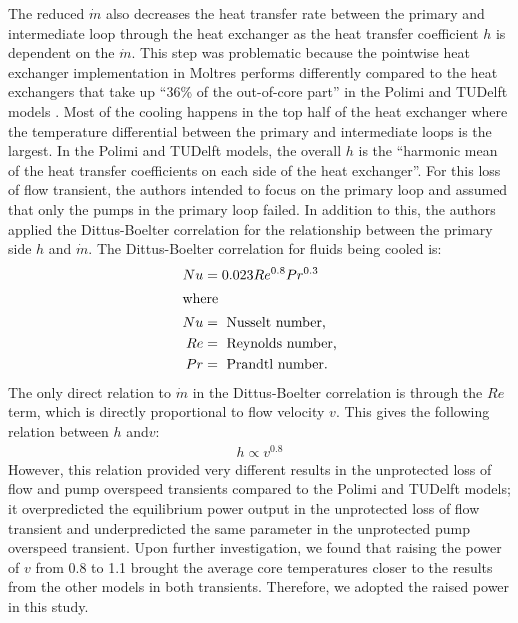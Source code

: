 The reduced $\dot{m}$ also decreases the heat transfer rate between the
primary and intermediate loop through the heat exchanger as the heat transfer
coefficient $h$ is dependent on the $\dot{m}$. This step was problematic
because
the pointwise heat exchanger implementation in Moltres performs differently
compared to the heat exchangers that take up ``36\% of the out-of-core part''
in the Polimi and TUDelft models \cite{fiorina_modelling_2014}. Most of the
cooling happens in the top half of the heat exchanger where the temperature
differential between the primary and intermediate loops is the largest. In the
Polimi and TUDelft models, the overall $h$ is the
``harmonic mean of the heat transfer coefficients on each side of the heat
exchanger''. For this loss of flow transient, the authors intended to focus on
the primary loop and assumed that only the pumps in the primary loop failed.
In addition to this, the authors applied the Dittus-Boelter correlation
\cite{dittus_heat_1930} for the relationship between the primary side $h$ and
$\dot{m}$. The Dittus-Boelter correlation for fluids being cooled is:
%
\begin{align}
    Nu &= 0.023 Re^{0.8} Pr^{0.3} \label{eq:db} \\
    \intertext{where}
    Nu &= \text{ Nusselt number,} \nonumber \\
    Re &= \text{ Reynolds number,} \nonumber \\
    Pr &= \text{ Prandtl number.} \nonumber
\end{align}
%
The only direct relation to $\dot{m}$ in the Dittus-Boelter correlation is
through the $Re$ term, which is directly proportional to flow velocity $v$.
This gives the following relation between $h$ and$v$:
%
\begin{align}
    h \propto v^{0.8} \label{eq:hv}
\end{align}
%
However, this relation provided very different results in the unprotected loss
of flow and pump overspeed transients compared to the Polimi and TUDelft
models; it overpredicted the equilibrium power output in the
unprotected loss of flow transient and underpredicted the same parameter in
the unprotected pump overspeed transient. Upon further investigation, we found
that raising the power of $v$ from 0.8 to 1.1 brought the average core
temperatures closer to the results from the other models in both transients.
Therefore, we adopted the raised power in this study.

